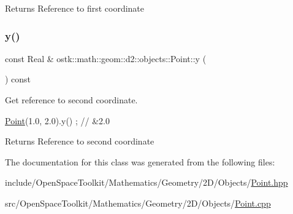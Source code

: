 \begin{DoxyReturn}{Returns}
Reference to first coordinate 
\end{DoxyReturn}
\mbox{\label{classostk_1_1math_1_1geom_1_1d2_1_1objects_1_1_point_a88caead5c128a3ca938506a8738ee279}} 
\subsubsection{\texorpdfstring{y()}{y()}}
{\footnotesize\ttfamily const Real \& ostk\+::math\+::geom\+::d2\+::objects\+::\+Point\+::y (\begin{DoxyParamCaption}{ }\end{DoxyParamCaption}) const}



Get reference to second coordinate. 


\begin{DoxyCode}
\hyperlink{classostk_1_1math_1_1geom_1_1d2_1_1objects_1_1_point_ad4252af4171fbe3cff37ada7827e1966}{Point}(1.0, 2.0).y() ; \textcolor{comment}{// &2.0}
\end{DoxyCode}


\begin{DoxyReturn}{Returns}
Reference to second coordinate 
\end{DoxyReturn}


The documentation for this class was generated from the following files\+:\begin{DoxyCompactItemize}
\item 
include/\+Open\+Space\+Toolkit/\+Mathematics/\+Geometry/2\+D/\+Objects/\hyperlink{2_d_2_objects_2_point_8hpp}{Point.\+hpp}\item 
src/\+Open\+Space\+Toolkit/\+Mathematics/\+Geometry/2\+D/\+Objects/\hyperlink{2_d_2_objects_2_point_8cpp}{Point.\+cpp}\end{DoxyCompactItemize}
